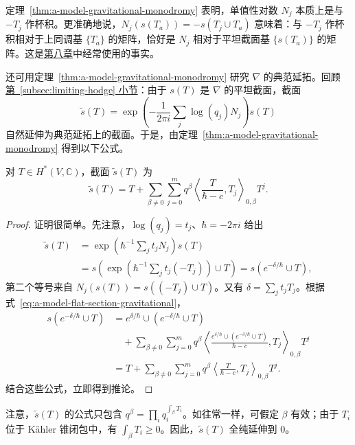 定理~\ref{thm:a-model-gravitational-monodromy} 表明，单值性对数 $N_j$ 本质上是与 $-T_j$ 作杯积。更准确地说，$N_j(s(T_a))=-s(T_j\cup T_a)$ 意味着：与 $-T_j$ 作杯积相对于上同调基 $\{T_a\}$ 的矩阵，恰好是 $N_j$ 相对于平坦截面基 $\{s(T_a)\}$ 的矩阵。这是\hyperref[chap:quantum-cohomology]{第八章}中经常使用的事实。

还可用定理~\ref{thm:a-model-gravitational-monodromy} 研究 $\nabla$ 的典范延拓。回顾\hyperref[subsec:limiting-hodge]{第~\ref*{subsec:limiting-hodge} 小节}：由于 $s(T)$ 是 $\nabla$ 的平坦截面，截面
\[
\widetilde s(T)=\exp\left(-\frac1{2\pi i}\sum_j\log(q_j)N_j\right)s(T)
\]
自然延伸为典范延拓上的截面。于是，由定理~\ref{thm:a-model-gravitational-monodromy} 得到以下公式。
\begin{corollary}\label{cor:a-model-canonical-gravitational-section}
对 $T\in H^*(V,\mathbb C)$，截面 $\widetilde s(T)$ 为
\[
\widetilde s(T)=T+\sum_{\beta\ne0}\sum_{j=0}^m q^\beta
\left\langle\frac{T}{\hbar-c},T_j\right\rangle_{0,\beta}T^j.
\]
\end{corollary}
\begin{proof}
证明很简单。先注意，$\log(q_j)=t_j$、$\hbar=-2\pi i$ 给出
\[
\begin{aligned}
\widetilde s(T)
&=\exp\left(\hbar^{-1}\sum_jt_jN_j\right)s(T)\\
&=s\left(\exp\left(\hbar^{-1}\sum_jt_j(-T_j)\right)\cup T\right)
=s(e^{-\delta/\hbar}\cup T),
\end{aligned}
\]
第二个等号来自 $N_j(s(T))=s((-T_j)\cup T)$。又有 $\delta=\sum_jt_jT_j$。根据式~\eqref{eq:a-model-flat-section-gravitational}，
\[
\begin{aligned}
s(e^{-\delta/\hbar}\cup T)
&=e^{\delta/\hbar}\cup(e^{-\delta/\hbar}\cup T)\\
&\quad+\sum_{\beta\ne0}\sum_{j=0}^m q^\beta
\left\langle\frac{e^{\delta/\hbar}\cup(e^{-\delta/\hbar}\cup T)}{\hbar-c},T_j\right\rangle_{0,\beta}T^j\\
&=T+\sum_{\beta\ne0}\sum_{j=0}^m q^\beta
\left\langle\frac{T}{\hbar-c},T_j\right\rangle_{0,\beta}T^j.
\end{aligned}
\]
结合这些公式，立即得到推论。
\end{proof}

注意，$\widetilde s(T)$ 的公式只包含 $q^\beta=\prod_iq_i^{\int_\beta T_i}$。如往常一样，可假定 $\beta$ 有效；由于 $T_i$ 位于 Kähler 锥闭包中，有 $\int_\beta T_i\ge0$。因此，$\widetilde s(T)$ 全纯延伸到 $0$。

